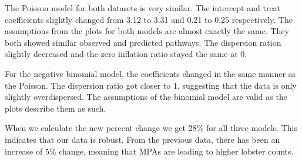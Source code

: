 \documentclass[
]{article}
\begin{document}
The Poisson model for both datasets is very similar. The intercept and
treat coefficients slightly changed from 3.12 to 3.31 and 0.21 to 0.25
respectively. The assumptions from the plots for both models are almost
exactly the same. They both showed similar observed and predicted
pathways. The dispersion ration slightly decreased and the zero
inflation ratio stayed the same at 0.

For the negative binomial model, the coefficients changed in the same
manner as the Poisson. The dispersion ratio got closer to 1, suggesting
that the data is only slightly overdispersed. The assumptions of the
binomial model are valid as the plots describe them as such.

When we calculate the new percent change we get 28\% for all three
models. This indicates that our data is robust. From the previous data,
there has been an increase of 5\% change, meaning that MPAs are leading
to higher lobster counts.
\end{document}
